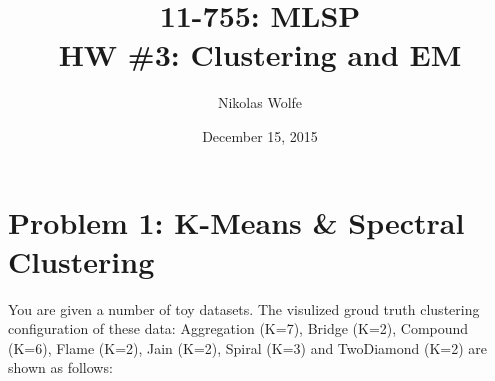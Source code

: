 \documentclass[11pt]{article}
\begin{document}
\title{{\bf 11-755: MLSP}\\
       HW \#3: Clustering and EM}

\author{Nikolas Wolfe}

\date{December 15, 2015}
\maketitle


\section*{Problem 1: K-Means \& Spectral Clustering}
You are given a number of toy datasets. The visulized groud truth clustering configuration of these data: Aggregation (K=7), Bridge (K=2), Compound (K=6), Flame (K=2), Jain (K=2), Spiral (K=3) and TwoDiamond (K=2) are shown as follows:
\end{document}

